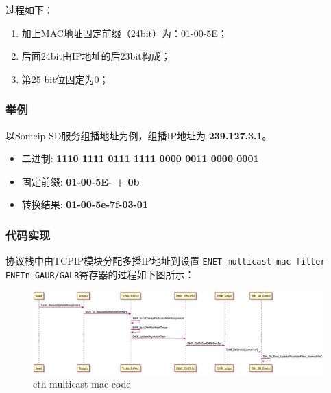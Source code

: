 过程如下：

\begin{enumerate}
    \item 加上MAC地址固定前缀（24bit）为：01-00-5E；
    \item 后面24bit由IP地址的后23bit构成；
    \item 第25 bit位固定为0；
\end{enumerate}

\subsubsection{举例}

以Someip SD服务组播地址为例，组播IP地址为 \textbf{239.127.3.1}。

\begin{itemize}
    \item 二进制: \textbf{1110 1111 0111 1111 0000 0011 0000 0001}
    \item 固定前缀: \textbf{01-00-5E- + 0b}
    \item 转换结果: \textbf{01-00-5e-7f-03-01}
\end{itemize}

\subsubsection{代码实现}

协议栈中由TCPIP模块分配多播IP地址到设置 \lstinline{ENET multicast mac filter ENETn_GAUR/GALR}寄存器的过程如下图所示：

\begin{figure}[h]
    \centering
    \includegraphics[scale=0.5]{pic/eth_multicast_mac_code.pdf}
    \caption{eth multicast mac code}
    \label{fig:eth_multicast_mac_code}
\end{figure}